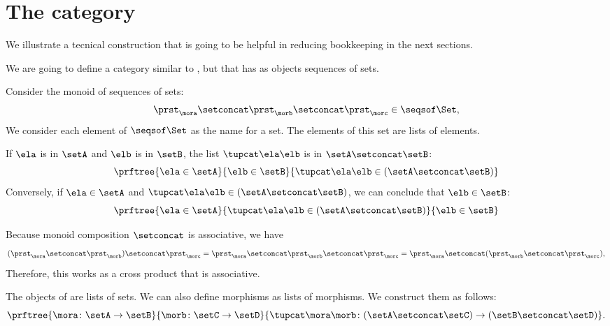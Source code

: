\section{The \SetStar category}
\label{sec:SetStar}

We illustrate a tecnical construction that is going to be helpful in reducing bookkeeping in the next sections.

We are going to define a category similar to \Set, but that has as objects sequences of sets.

Consider the monoid of sequences of sets:
%
\begin{equation}
    \label{eq:sets-monoid}
    \prst_{\mora} \setconcat \prst_{\morb} \setconcat \prst_{\morc} \in \seqsof\Set,
\end{equation}
%
We consider each element of $\seqsof\Set$ as the name for a set. The elements of this set are lists of elements.

If $\ela$ is in $\setA$ and $\elb$ is in $\setB$, the list $\tupcat \ela \elb$ is in $\setA \setconcat \setB$:
%
\begin{equation}
    \label{eq:sets-monoid-axiom1}
    \prftree{\ela \in \setA}{\elb \in \setB}{ \tupcat \ela \elb \in (\setA \setconcat \setB) }
\end{equation}
%
Conversely, if $\ela \in \setA$ and $\tupcat \ela \elb \in (\setA \setconcat \setB)$, we can conclude that $\elb \in \setB$:
%
\begin{equation}
    \label{eq:sets-monoid-axiom2}
    \prftree{\ela \in \setA}{ \tupcat \ela \elb \in (\setA \setconcat \setB) }{  \elb \in  \setB }
\end{equation}


Because monoid composition $\setconcat$ is associative, we have
%
\begin{equation}
    \label{eq:sets-monoid-comp}
    (\prst_{\mora} \setconcat \prst_{\morb} )\setconcat \prst_{\morc} =
    \prst_{\mora} \setconcat \prst_{\morb} \setconcat \prst_{\morc} =
    \prst_{\mora} \setconcat (\prst_{\morb} \setconcat \prst_{\morc}),
\end{equation}
%
Therefore, this works as a cross product that is associative.

The objects of \SetStar are lists of sets.
We can also define morphisms as lists of morphisms.
We construct them as follows:
%
\begin{equation}
    \label{eq:sets-monoid-maps2}
    \prftree{ \mora \colon \setA \to \setB}{ \morb \colon \setC \to \setD}{ \tupcat \mora \morb \colon (\setA \setconcat \setC)\to (\setB \setconcat \setD)}.
\end{equation}

